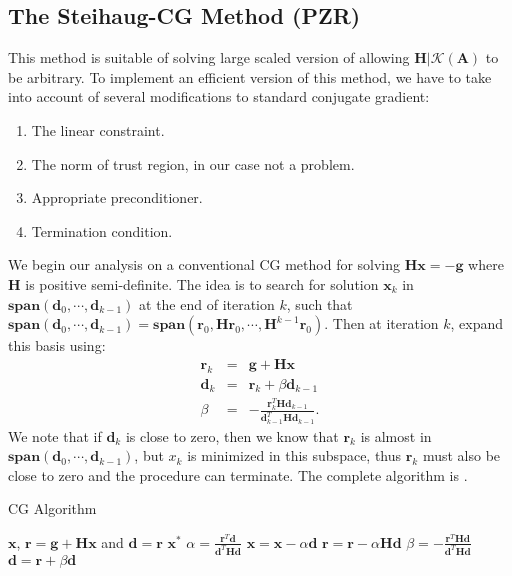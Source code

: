 \documentclass[annual]{acmsiggraph}
\newcommand{\E}[1]{\mathbf{#1}}
\begin{document}
\subsection{The Steihaug-CG Method (PZR)}
This method is suitable of solving large scaled version of  allowing $\E{H}|\mathcal{K}(\E{A})$ to be arbitrary. To implement an efficient version of this method, we have to take into account of several modifications to standard conjugate gradient:
\begin{enumerate}
\item The linear constraint.
\item The norm of trust region, in our case not a problem.
\item Appropriate preconditioner.
\item Termination condition.
\end{enumerate}

We begin our analysis on a conventional CG method for solving $\E{H}\E{x}=-\E{g}$ where $\E{H}$ is positive semi-definite. The idea is to search for solution $\E{x}_k$ in $\E{span}(\E{d}_0,\cdots,\E{d}_{k-1})$ at the end of iteration $k$, such that $\E{span}(\E{d}_0,\cdots,\E{d}_{k-1})=\E{span}(\E{r}_0,\E{H}\E{r}_0,\cdots,\E{H}^{k-1}\E{r}_0)$. Then at iteration $k$, expand this basis using:
\begin{eqnarray*}
\E{r}_k&=&\E{g}+\E{H}\E{x}	\\
\E{d}_k&=&\E{r}_k+\beta\E{d}_{k-1}	\\
\beta&=&-\frac{\E{r}_k^T\E{H}\E{d}_{k-1}}{\E{d}_{k-1}^T\E{H}\E{d}_{k-1}}.
\end{eqnarray*}
We note that if $\E{d}_k$ is close to zero, then we know that $\E{r}_k$ is almost in $\E{span}(\E{d}_0,\cdots,\E{d}_{k-1})$, but $x_k$ is minimized in this subspace, thus $\E{r}_k$ must also be close to zero and the procedure can terminate. The complete algorithm is .
\begin{algorithm}[h]
\caption{CG Algorithm}
\label{alg:CG}
\begin{algorithmic}
\REQUIRE $\E{x}$, $\E{r}=\E{g}+\E{H}\E{x}$ and $\E{d}=\E{r}$
\ENSURE $\E{x}^*$
\WHILE{$\|\E{r}\|$ not small}
\STATE $\alpha=\frac{\E{r}^T\E{d}}{\E{d}^T\E{H}\E{d}}$
\STATE $\E{x}=\E{x}-\alpha\E{d}$
\STATE $\E{r}=\E{r}-\alpha\E{H}\E{d}$
\STATE $\beta=-\frac{\E{r}^T\E{H}\E{d}}{\E{d}^T\E{H}\E{d}}$
\STATE $\E{d}=\E{r}+\beta\E{d}$
\ENDWHILE
\end{algorithmic}
\end{algorithm}
\end{document}
